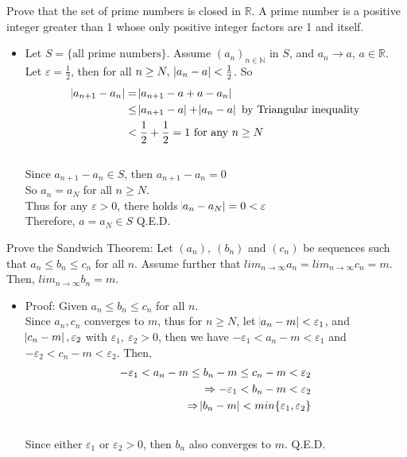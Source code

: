 \documentclass[]{exam}
\begin{document}
\begin{questions}
\question Prove that the set of prime numbers is closed in $\mathbb{R}$. A prime number is a positive integer greater than 1 whose only positive integer factors are 1 and itself.
	\begin{itemize} 
		\item Let $S = \{\text{all prime numbers}\}$. Assume $(a_n)_{n\in\mathbb{N}}$ in $S$, and $a_n \rightarrow a$, $a\in\mathbb{R}$. Let $\varepsilon = \frac{1}{2}$, then for all $n \geq N,\ \abs{a_n - a} < \frac{1}{2}$. So
		\begin{align*}
		\abs{a_{n + 1} - a_n}	&=\abs{a_{n + 1} - a + a - a_n}\\
								&\leq \abs{a_{n + 1} - a} + \abs{a_n - a} \text{ by Triangular inequality}\\
								&< \frac{1}{2} + \frac{1}{2} = 1 \text{ for any $n \geq N$}
		\end{align*}
		\\ Since $a_{n + 1} - a_n \in S$, then $a_{n + 1} - a_n = 0$
		\\ So $a_n = a_N$ for all $n \geq N$.
		\\ Thus for any $\varepsilon > 0$, there holds $\abs{a_n - a_N} = 0 < \varepsilon$
		\\ Therefore, $a = a_N \in S$ Q.E.D.
	\end{itemize}

\question Prove the Sandwich Theorem: Let $(a_n),\ (b_n)$ and $(c_n)$ be sequences such that $a_n \leq b_n \leq c_n$ for all $n.$ Assume further that $lim_{n\rightarrow\infty} a_n = lim_{n\rightarrow\infty} c_n = m$. Then, $lim_{n\rightarrow\infty} b_n = m.$
	\begin{itemize}
		\item Proof: Given $a_n \leq b_n \leq c_n$ for all $n.$ 
		\\ Since $a_n,c_n$ converges to $m$, thus for $n\geq N$, let $\abs{a_n - m} < \varepsilon_1$, and $\abs{c_n - m} , \varepsilon_2$ with $\varepsilon_1,\ \varepsilon_2 > 0$, then we have $-\varepsilon_1 < a_n - m < \varepsilon_1$ and $-\varepsilon_2 < c_n - m < \varepsilon_2$. Then,
		\begin{equation*}
		\begin{split}
		-\varepsilon_1 < a_n - m \leq b_n - m \leq c_n - m < \varepsilon_2\\
		\Rightarrow -\varepsilon_1 < b_n - m < \varepsilon_2\\
		\Rightarrow \abs{b_n - m} < min\{\varepsilon_1, \varepsilon_2\}
		\end{split}
		\end{equation*}
		\\ Since either $\varepsilon_1\text{ or } \varepsilon_2 > 0$, then $b_n$ also converges to $m$. Q.E.D.
	\end{itemize}



\end{questions}
\end{document}
